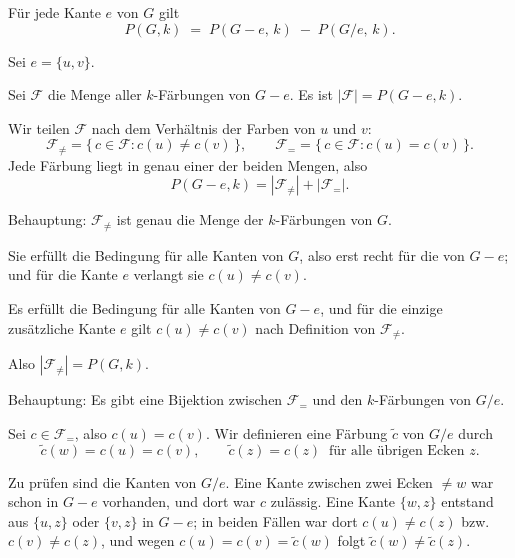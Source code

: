 \begin{merksatz}
Für jede Kante $e$ von $G$ gilt
\[ P(G, k) \;=\; P(G-e,\, k) \;-\; P(G/e,\, k) . \]
\end{merksatz}

\begin{merksatz}
Sei $e = \{u,v\}$.

Sei $\mathcal{F}$ die Menge aller $k$-Färbungen von $G - e$. Es ist $|\mathcal{F}| = P(G-e,k)$.

Wir teilen $\mathcal{F}$ nach dem Verhältnis der Farben von $u$ und $v$:
\[ \mathcal{F}_{\neq} = \{\, c \in \mathcal{F} : c(u) \neq c(v) \,\}, \qquad
   \mathcal{F}_{=} = \{\, c \in \mathcal{F} : c(u) = c(v) \,\} . \]
Jede Färbung liegt in genau einer der beiden Mengen, also
\[ P(G-e,k) = |\mathcal{F}_{\neq}| + |\mathcal{F}_{=}| . \]

Behauptung: $\mathcal{F}_{\neq}$ ist genau die Menge der $k$-Färbungen von $G$.

 Sie erfüllt die Bedingung für alle Kanten von $G$, also erst recht für die von $G-e$; und für die Kante $e$ verlangt sie $c(u) \neq c(v)$.

 Es erfüllt die Bedingung für alle Kanten von $G-e$, und für die einzige zusätzliche Kante $e$ gilt $c(u) \neq c(v)$ nach Definition von $\mathcal{F}_{\neq}$.

Also $|\mathcal{F}_{\neq}| = P(G,k)$.

Behauptung: Es gibt eine Bijektion zwischen $\mathcal{F}_{=}$ und den $k$-Färbungen von $G/e$.

 Sei $c \in \mathcal{F}_{=}$, also $c(u) = c(v)$. Wir definieren eine Färbung $\tilde{c}$ von $G/e$ durch
\[ \tilde{c}(w) = c(u) = c(v), \qquad \tilde{c}(z) = c(z) \ \text{ für alle übrigen Ecken } z . \]

 Zu prüfen sind die Kanten von $G/e$. Eine Kante zwischen zwei Ecken $\neq w$ war schon in $G-e$ vorhanden, und dort war $c$ zulässig. Eine Kante $\{w, z\}$ entstand aus $\{u,z\}$ oder $\{v,z\}$ in $G-e$; in beiden Fällen war dort $c(u) \neq c(z)$ bzw. $c(v) \neq c(z)$, und wegen $c(u)=c(v)=\tilde c(w)$ folgt $\tilde{c}(w) \neq \tilde{c}(z)$. \checkmark


\end{merksatz}
